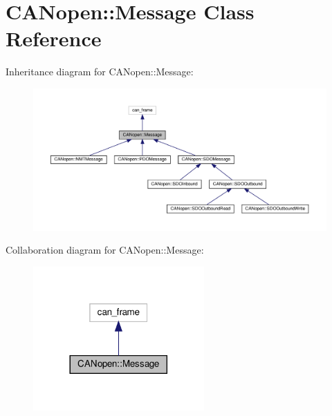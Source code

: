 \hypertarget{class_c_a_nopen_1_1_message}{}\section{C\+A\+Nopen\+:\+:Message Class Reference}
\label{class_c_a_nopen_1_1_message}


Inheritance diagram for C\+A\+Nopen\+:\+:Message\+:\nopagebreak
\begin{figure}[H]
\begin{center}
\leavevmode
\includegraphics[width=350pt]{class_c_a_nopen_1_1_message__inherit__graph}
\end{center}
\end{figure}


Collaboration diagram for C\+A\+Nopen\+:\+:Message\+:\nopagebreak
\begin{figure}[H]
\begin{center}
\leavevmode
\includegraphics[width=185pt]{class_c_a_nopen_1_1_message__coll__graph}
\end{center}
\end{figure}
